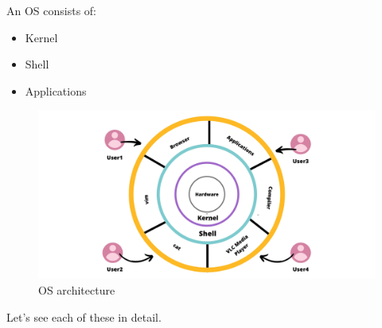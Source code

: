 \begin{flushleft}
	An OS consists of:
	\begin{itemize}
		\item Kernel
		\item Shell
		\item Applications
	\end{itemize}
	\begin{figure}[h!]
		\centering
		\includegraphics[scale=.08]{content/chapter1/images/os_structure.jpg}
		\caption{OS architecture}
		\label{fig:OS_Structure}
	\end{figure}
	Let's see each of these in detail.
	
	\newpage
	

\end{flushleft}
